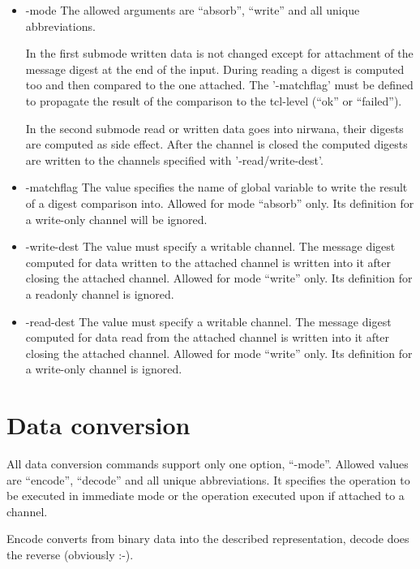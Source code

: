 \documentclass {report}
\begin{document}
\begin {itemize}
\item[-mode]	The allowed arguments are ``absorb'', ``write'' and
		all unique abbreviations.

		In the first submode written data is not changed
		except for attachment of the message digest at the
		end of the input. During reading a digest is computed
		too and then compared to the one attached. The
		'-matchflag' must be defined to propagate the result
		of the comparison to the tcl-level (``ok'' or ``failed'').

		In the second submode read or written data goes into
		nirwana, their digests are computed as
		side effect. After the channel is closed the computed
		digests are written to the channels specified with
		'-read/write-dest'.

\item[-matchflag]	The value specifies the name of global
			variable to write the result of a digest
			comparison into. Allowed for mode ``absorb''
			only. Its definition for a write-only channel
			will be ignored.

\item[-write-dest]	The value must specify a writable channel. The
			message digest computed for data written to
			the attached channel is written into it after
			closing the attached channel. Allowed for mode
			``write'' only. Its definition for a readonly
			channel is ignored.

\item[-read-dest]	The value must specify a writable channel. The
			message digest computed for data read from
			the attached channel is written into it after
			closing the attached channel. Allowed for mode
			``write'' only. Its definition for a write-only
			channel is ignored.
\end   {itemize}


\section {Data conversion}

All data conversion commands support only one option,
``-mode''. Allowed values are ``encode'', ``decode'' and all unique
abbreviations. It specifies the operation to be executed in immediate
mode or the operation executed upon  if attached to a
channel.

Encode converts from binary data into the described representation,
decode does the reverse (obviously :-).
\end{document}
